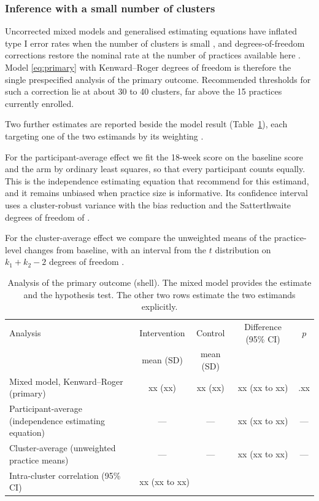 \documentclass[11pt,a4paper]{article}
\begin{document}
\subsubsection{Inference with a small number of clusters}
\label{sec:smallk}

Uncorrected mixed models and generalised estimating equations have inflated
type I error rates when the number of clusters is small
\citep{taljaard2016, kahan2016}, and degrees-of-freedom corrections restore
the nominal rate at the number of practices available here
\citep{leyrat2018}. Model \eqref{eq:primary} with Kenward--Roger
degrees of freedom is therefore the single prespecified analysis of the
primary outcome. Recommended thresholds for such a correction lie at about
30 \citep{billot2024} to 40 \citep{hemming2023} clusters, far above the 15
practices currently enrolled.

Two further estimates are reported beside the model result
(Table~\ref{tab:prim}), each targeting one of the two estimands by its
weighting \citep{hayes2017, kahan2023}.

For the participant-average effect we fit the 18-week score on the baseline
score and the arm by ordinary least squares, so that every participant
counts equally. This is the independence estimating equation that
\citet{kahan2023} recommend for this estimand, and it remains unbiased when
practice size is informative. Its confidence interval uses a cluster-robust
variance with the bias reduction and the Satterthwaite degrees of freedom of
\citet{bell2002}.

For the cluster-average effect we compare the unweighted means of the
practice-level changes from baseline, with an interval from the $t$
distribution on $k_1 + k_2 - 2$ degrees of freedom \citep[section
10.3.1]{hayes2017}.

\begin{table}[ht]
\centering\small
\caption{Analysis of the primary outcome (shell). The mixed model provides the
estimate and the hypothesis test. The other two rows estimate the two
estimands explicitly.}
\label{tab:prim}
\begin{tabularx}{\textwidth}{Xcccc}
\toprule
Analysis & Intervention & Control & Difference (95\% CI) & $p$\\
& mean (SD) & mean (SD) & &\\
\midrule
Mixed model, Kenward--Roger (primary) & xx (xx) & xx (xx) & xx (xx to xx) & .xx\\
Participant-average (independence estimating equation) & --- & --- & xx (xx to xx) & ---\\
Cluster-average (unweighted practice means) & --- & --- & xx (xx to xx) & ---\\
\midrule
Intra-cluster correlation (95\% CI) & \multicolumn{4}{l}{xx (xx to xx)}\\
\bottomrule
\end{tabularx}
\end{table}
\end{document}
